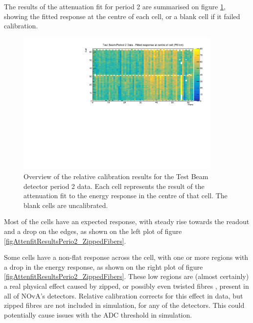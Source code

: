 \documentclass[12pt,a4paper]{article}
\begin{document}
The results of the attenuation fit for period 2 are summarised on figure \ref{figCellCentreResponsePeriod2}, showing the fitted response at the centre of each cell, or a blank cell if it failed calibration.

\begin{figure}[h]
\centering
\includegraphics[width=0.9\textwidth]{Plots/CellResponseAtCentre_period2_Limited.pdf}
\caption{Overview of the relative calibration results for the Test Beam detector period 2 data. Each cell represents the result of the attenuation fit to the energy response in the centre of that cell. The blank cells are uncalibrated.}
\label{figCellCentreResponsePeriod2}
\end{figure}

Most of the cells have an expected response, with steady rise towards the readout and a drop on the edges, as shown on the left plot of figure \ref{figAttenfitResultsPerio2_ZippedFibers}.

Some cells have a non-flat response across the cell, with one or more regions with a drop in the energy response, as shown on the right plot of figure \ref{figAttenfitResultsPerio2_ZippedFibers}. These low regions are (almost certainly) a real physical effect caused by zipped, or possibly even twisted fibres \cite{NOVA-doc-43249}, present in all of NOvA's detectors. Relative calibration corrects for this effect in data, but zipped fibres are not included in simulation, for any of the detectors. This could potentially cause issues with the ADC threshold in simulation.
\end{document}
